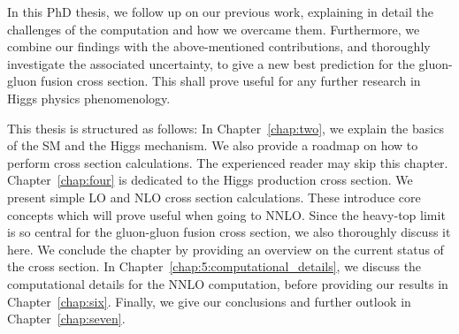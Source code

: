 In this PhD thesis, we follow up on our previous work, explaining in detail the challenges of the computation and how we overcame them. Furthermore, we combine our findings with the above-mentioned contributions, and thoroughly investigate the associated uncertainty, to give a new best prediction for the gluon-gluon fusion cross section. This shall prove useful for any further research in Higgs physics phenomenology.

This thesis is structured as follows: In Chapter~\ref{chap:two}, we explain the basics of the \acs{SM} and the Higgs mechanism. We also provide a roadmap on how to perform cross section calculations. The experienced reader may skip this chapter. Chapter~\ref{chap:four} is dedicated to the Higgs production cross section. We present simple \acs{LO} and \acs{NLO} cross section calculations. These introduce core concepts which will prove useful when going to \acs{NNLO}. Since the heavy-top limit is so central for the gluon-gluon fusion cross section, we also thoroughly discuss it here. We conclude the chapter by providing an overview on the current status of the cross section. In Chapter~\ref{chap:5:computational_details}, we discuss the computational details for the \acs{NNLO} computation, before providing our results in Chapter~\ref{chap:six}. Finally, we give our conclusions and further outlook in Chapter~\ref{chap:seven}.
